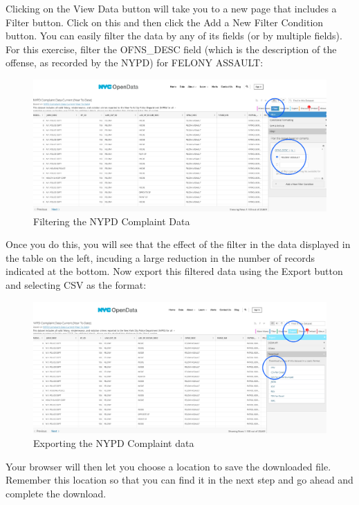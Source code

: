 \documentclass[]{book}
\begin{document}
Clicking on the View Data button will take you to a new page that includes a Filter button. Click on this and then click the Add a New Filter Condition button. You can easily filter the data by any of its fields (or by multiple fields). For this exercise, filter the OFNS\_DESC field (which is the description of the offense, as recorded by the NYPD) for FELONY ASSAULT:

\begin{figure}
\centering
\includegraphics{images/NYPD_CD_filter.png}
\caption{Filtering the NYPD Complaint Data}
\end{figure}

Once you do this, you will see that the effect of the filter in the data displayed in the table on the left, incuding a large reduction in the number of records indicated at the bottom. Now export this filtered data using the Export button and selecting CSV as the format:

\begin{figure}
\centering
\includegraphics{images/NYPD_CD_visualize_export.png}
\caption{Exporting the NYPD Complaint data}
\end{figure}

Your browser will then let you choose a location to save the downloaded file. Remember this location so that you can find it in the next step and go ahead and complete the download.
\end{document}
